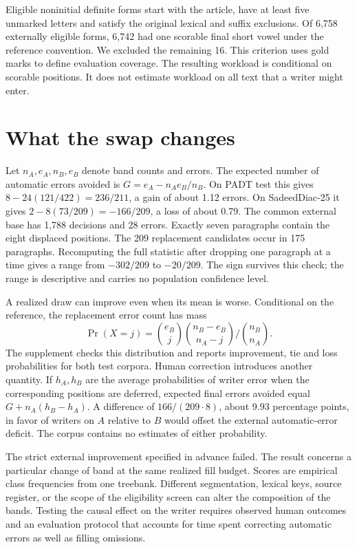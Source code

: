\documentclass[11pt]{article}
\begin{document}
Eligible noninitial definite forms start with the article, have at least five unmarked letters and satisfy the original lexical and suffix exclusions. Of 6,758 externally eligible forms, 6,742 had one scorable final short vowel under the reference convention. We excluded the remaining 16. This criterion uses gold marks to define evaluation coverage. The resulting workload is conditional on scorable positions. It does not estimate workload on all text that a writer might enter.
\newpage
\section{What the swap changes}
Let \(n_A,e_A,n_B,e_B\) denote band counts and errors. The expected number of automatic errors avoided is \(G=e_A-n_A e_B/n_B\). On PADT test this gives \(8-24(121/422)=236/211\), a gain of about 1.12 errors. On SadeedDiac-25 it gives \(2-8(73/209)=-166/209\), a loss of about 0.79. The common external base has 1,788 decisions and 28 errors. Exactly seven paragraphs contain the eight displaced positions. The 209 replacement candidates occur in 175 paragraphs. Recomputing the full statistic after dropping one paragraph at a time gives a range from \(-302/209\) to \(-20/209\). The sign survives this check; the range is descriptive and carries no population confidence level.

A realized draw can improve even when its mean is worse. Conditional on the reference, the replacement error count has mass
\[
 \Pr(X=j)=
 \binom{e_B}{j}\binom{n_B-e_B}{n_A-j}\big/\binom{n_B}{n_A}.
\]
The supplement checks this distribution and reports improvement, tie and loss probabilities for both test corpora. Human correction introduces another quantity. If \(h_A,h_B\) are the average probabilities of writer error when the corresponding positions are deferred, expected final errors avoided equal \(G+n_A(h_B-h_A)\). A difference of \(166/(209\cdot8)\), about 9.93 percentage points, in favor of writers on \(A\) relative to \(B\) would offset the external automatic-error deficit. The corpus contains no estimates of either probability.

The strict external improvement specified in advance failed. The result concerns a particular change of band at the same realized fill budget. Scores are empirical class frequencies from one treebank. Different segmentation, lexical keys, source register, or the scope of the eligibility screen can alter the composition of the bands. Testing the causal effect on the writer requires observed human outcomes and an evaluation protocol that accounts for time spent correcting automatic errors as well as filling omissions.
\end{document}
